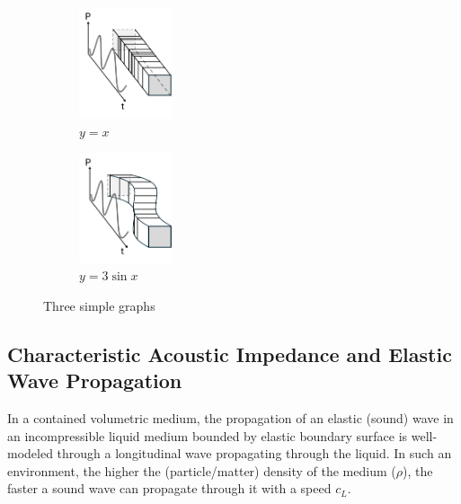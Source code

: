 \begin{figure}[ht]
     \centering
     \begin{subfigure}[b]{0.3\textwidth}
         \centering
         \includegraphics[width=0.3\textwidth]{Chapters/Figures/Ch2_UltrasoundFundamentals/longitudinal_wave.pdf}
         \caption{$y=x$}
         \label{fig:ch2_longitudinal}
     \end{subfigure}
     \hfill
     \begin{subfigure}[b]{0.3\textwidth}
         \centering
         \includegraphics[width=0.3\textwidth]{Chapters/Figures/Ch2_UltrasoundFundamentals/transversal_wave.pdf}
         \caption{$y=3\sin x$}
         \label{fig:ch2_transversal}
     \end{subfigure}
        \caption{Three simple graphs}
        \label{fig:ch2_elastic_waves}
\end{figure}

\subsection{Characteristic Acoustic Impedance and Elastic Wave Propagation}
\label{subsec:ch2_3_propagation}

In a contained volumetric medium, the propagation of an elastic (sound) wave 
in an incompressible liquid medium bounded by elastic boundary surface is 
well-modeled through a longitudinal wave propagating through the liquid. 
In such an environment, the higher the (particle/matter) density of the medium ($\rho$), 
the faster a sound wave can propagate through it with a speed $c_L$.

